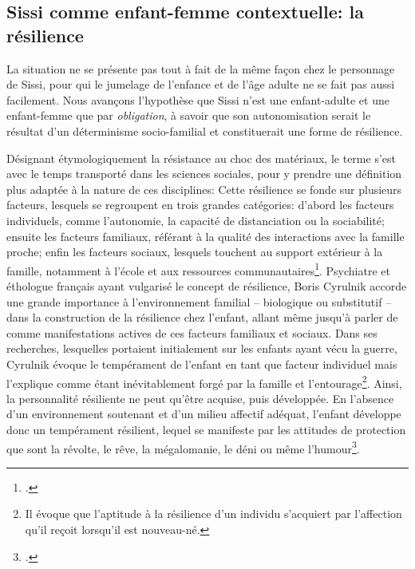 \subsection{Sissi comme enfant-femme contextuelle: la résilience}
La situation ne se présente pas tout à fait de la même façon chez le personnage de Sissi, pour qui le jumelage de l'enfance et de l'âge adulte ne se fait pas aussi facilement.
Nous avançons l'hypothèse que Sissi n'est une enfant-adulte et une enfant-femme que par \textit{obligation}, à savoir que son autonomisation serait le résultat d'un déterminisme socio-familial et constituerait une forme de résilience.
\par
Désignant étymologiquement la résistance au choc des matériaux, le terme  s'est avec le temps transporté dans les sciences sociales, pour y prendre une définition plus adaptée à la nature de ces disciplines: 
Cette résilience se fonde sur plusieurs facteurs, lesquels se regroupent en trois grandes catégories: d'abord les facteurs individuels, comme l'autonomie, la capacité de distanciation ou la sociabilité; ensuite les facteurs familiaux, référant à la qualité des interactions avec la famille proche; enfin les facteurs sociaux, lesquels touchent au support extérieur à la famille, notamment à l'école et aux ressources communautaires\footcite{Anaut2005}.
Psychiatre et éthologue français ayant vulgarisé le concept de résilience, Boris Cyrulnik accorde une grande importance à l'environnement familial -- biologique ou substitutif -- dans la construction de la résilience chez l'enfant, allant même jusqu'à parler de  comme manifestations actives de ces facteurs familiaux et sociaux.
Dans ses recherches, lesquelles portaient initialement sur les enfants ayant vécu la guerre, Cyrulnik évoque le tempérament de l'enfant en tant que facteur individuel mais l'explique comme étant inévitablement forgé par la famille et l'entourage\footnote{Il évoque que l'aptitude à la résilience d'un individu s'acquiert par l'affection qu'il reçoit lorsqu'il est nouveau-né.}.
Ainsi, la personnalité résiliente ne peut qu'être acquise, puis développée.
En l'absence d'un environnement soutenant et d'un milieu affectif adéquat, l'enfant développe donc un tempérament résilient, lequel se manifeste par les attitudes de protection que sont la révolte, le rêve, la mégalomanie, le déni ou même l'humour\footcite[3]{Taubes2001}.

